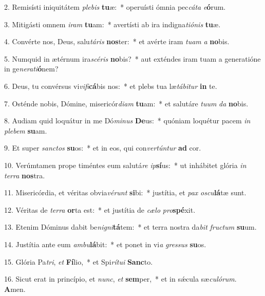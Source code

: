 2. Remisísti iniquitátem \textit{ple}\textit{bis} \textbf{tu}æ:~*  operuísti ómnia pec\textit{cá}\textit{ta} \textit{e}\textbf{ó}rum.\

3. Mitigásti omnem \textit{i}\textit{ram} \textbf{tu}am:~*  avertísti ab ira indigna\textit{ti}\textit{ó}\textit{nis} \textbf{tu}æ.\

4. Convérte nos, Deus, salu\textit{tá}\textit{ris} \textbf{nos}ter:~*  et avérte iram \textit{tu}\textit{am} \textit{a} \textbf{no}bis.\

5. Numquid in ætérnum ira\textit{scé}\textit{ris} \textbf{no}bis?~*  aut exténdes iram tuam a generatióne in ge\textit{ne}\textit{ra}\textit{ti}\textbf{ó}nem?\

6. Deus, tu convérsus vi\textit{vi}\textit{fi}\textbf{cá}bis nos:~*  et plebs tua læ\textit{tá}\textit{bi}\textit{tur} \textbf{in} te.\

7. Osténde nobis, Dómine, misericór\textit{di}\textit{am} \textbf{tu}am:~*  et salutáre \textit{tu}\textit{um} \textit{da} \textbf{no}bis.\

8. Audiam quid loquátur in me Dó\textit{mi}\textit{nus} \textbf{De}us:~*  quóniam loquétur pacem \textit{in} \textit{ple}\textit{bem} \textbf{su}am.\

9. Et super \textit{sanc}\textit{tos} \textbf{su}os:~*  et in eos, qui con\textit{ver}\textit{tún}\textit{tur} \textbf{ad} cor.\

10. Verúmtamen prope timéntes eum salutá\textit{re} \textit{ip}\textbf{sí}us:~*  ut inhábitet glória \textit{in} \textit{ter}\textit{ra} \textbf{nos}tra.\

11. Misericórdia, et véritas obvia\textit{vé}\textit{runt} \textbf{si}bi:~*  justítia, et \textit{pax} \textit{os}\textit{cu}\textbf{lá}tæ sunt.\

12. Véritas de \textit{ter}\textit{ra} \textbf{or}ta est:~*  et justítia de \textit{cæ}\textit{lo} \textit{pro}\textbf{spé}xit.\

13. Etenim Dóminus dabit be\textit{ni}\textit{gni}\textbf{tá}tem:~*  et terra nostra da\textit{bit} \textit{fruc}\textit{tum} \textbf{su}um.\

14. Justítia ante eum \textit{am}\textit{bu}\textbf{lá}bit:~*  et ponet in vi\textit{a} \textit{gres}\textit{sus} \textbf{su}os.\

15. Glória Pa\textit{tri}, \textit{et} \textbf{Fí}lio,~*  et Spi\textit{rí}\textit{tu}\textit{i} \textbf{Sanc}to.\

16. Sicut erat in princípio, et \textit{nunc}, \textit{et} \textbf{sem}per,~*  et in sǽcula sæ\textit{cu}\textit{ló}\textit{rum}. \textbf{A}men.\

